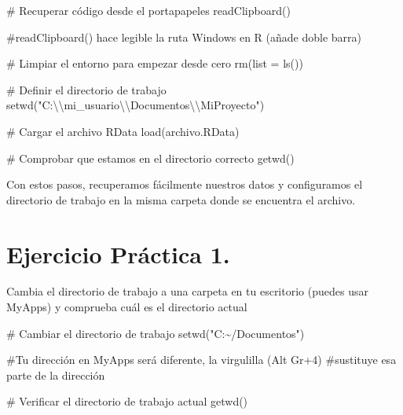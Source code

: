 \documentclass[
  letterpaper,
]{scrbook}
\newenvironment{Shaded}{\begin{snugshade}}{\end{snugshade}}
\newcommand{\AttributeTok}[1]{\textcolor[rgb]{0.40,0.45,0.13}{#1}}
\newcommand{\CommentTok}[1]{\textcolor[rgb]{0.37,0.37,0.37}{#1}}
\newcommand{\FunctionTok}[1]{\textcolor[rgb]{0.28,0.35,0.67}{#1}}
\newcommand{\NormalTok}[1]{\textcolor[rgb]{0.00,0.23,0.31}{#1}}
\newcommand{\SpecialCharTok}[1]{\textcolor[rgb]{0.37,0.37,0.37}{#1}}
\newcommand{\StringTok}[1]{\textcolor[rgb]{0.13,0.47,0.30}{#1}}
\begin{document}
\begin{Shaded}
\begin{Highlighting}[]
\CommentTok{\# Recuperar código desde el portapapeles}
\FunctionTok{readClipboard}\NormalTok{()}

\CommentTok{\#readClipboard() hace legible la ruta Windows en R (añade doble barra)}

\CommentTok{\# Limpiar el entorno para empezar desde cero}
\FunctionTok{rm}\NormalTok{(}\AttributeTok{list =} \FunctionTok{ls}\NormalTok{())}

\CommentTok{\# Definir el directorio de trabajo}
\FunctionTok{setwd}\NormalTok{(}\StringTok{"C:}\SpecialCharTok{\textbackslash{}\textbackslash{}}\StringTok{mi\_usuario}\SpecialCharTok{\textbackslash{}\textbackslash{}}\StringTok{Documentos}\SpecialCharTok{\textbackslash{}\textbackslash{}}\StringTok{MiProyecto"}\NormalTok{)}

\CommentTok{\# Cargar el archivo RData}
\FunctionTok{load}\NormalTok{(archivo.RData)}

\CommentTok{\# Comprobar que estamos en el directorio correcto}
\FunctionTok{getwd}\NormalTok{()}
\end{Highlighting}
\end{Shaded}

Con estos pasos, recuperamos fácilmente nuestros datos y configuramos el
directorio de trabajo en la misma carpeta donde se encuentra el archivo.

\hypertarget{ejercicio-pruxe1ctica-1.}{%
\chapter{Ejercicio Práctica 1.}\label{ejercicio-pruxe1ctica-1.}}

Cambia el directorio de trabajo a una carpeta en tu escritorio (puedes
usar MyApps) y comprueba cuál es el directorio actual

\begin{Shaded}
\begin{Highlighting}[]
\CommentTok{\# Cambiar el directorio de trabajo}
\FunctionTok{setwd}\NormalTok{(}\StringTok{"C:\textasciitilde{}/Documentos"}\NormalTok{)}

\CommentTok{\#Tu dirección en MyApps será diferente, la virgulilla (Alt Gr+4) }
\CommentTok{\#sustituye esa parte de la dirección}

\CommentTok{\# Verificar el directorio de trabajo actual}
\FunctionTok{getwd}\NormalTok{()}
\end{Highlighting}
\end{Shaded}
\end{document}
